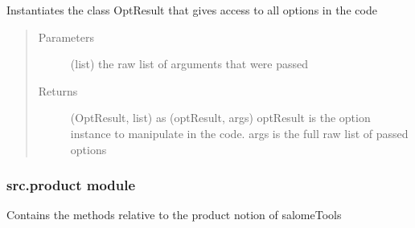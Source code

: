 \documentclass[a4paper,10pt,english]{sphinxmanual}
\begin{document}
\begin{fulllineitems}
\begin{fulllineitems}
\end{fulllineitems}


\begin{fulllineitems}
\label{\detokenize{apidoc_src/src:src.options.Options.parse_args}}
Instantiates the class OptResult 
that gives access to all options in the code
\begin{quote}\begin{description}
\item[{Parameters}] \leavevmode
{} \textendash{} (list) the raw list of arguments that were passed

\item[{Returns}] \leavevmode
(OptResult, list) as (optResult, args) 
optResult is the option instance to manipulate in the code. 
args is the full raw list of passed options

\end{description}\end{quote}

\end{fulllineitems}


\end{fulllineitems}



\subsubsection{src.product module}
\label{\detokenize{apidoc_src/src:module-src.product}}\label{\detokenize{apidoc_src/src:src-product-module}}
Contains the methods 
relative to the product notion of salomeTools
\end{document}
